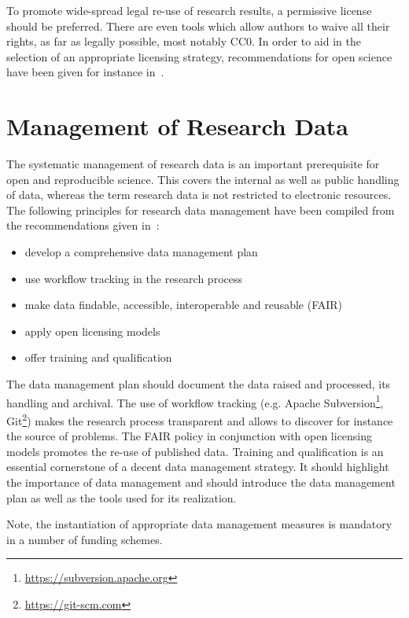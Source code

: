 \documentclass[a4paper, 10pt, twocolumn]{article}
\begin{document}
To promote wide-spread legal re-use of research results, a permissive license should be preferred.
There are even tools which allow authors to waive all their rights,
as far as legally possible, most notably CC0.
In order to aid in the selection of an appropriate licensing strategy, recommendations
for open science have been given for instance in~\cite{Stodden09:CSE}.


\section*{Management of Research Data} \label{sec:data_management}

The systematic management of research data is an important prerequisite for open and 
reproducible science. This covers the internal as well as public handling of data, whereas
the term research data is not restricted to electronic resources. The following principles
for research data management have been compiled from the recommendations given 
in~\cite{DFG_GWP:Book,HRK_FDM:WWW,Stodden2014:JORS,H2020_FAIR:ERC}:
\begin{itemize}
\item develop a comprehensive data management plan
\item use workflow tracking in the research process
\item make data findable, accessible, interoperable and reusable (FAIR)~\cite{H2020_FAIR:ERC}
\item apply open licensing models
\item offer training and qualification
\end{itemize}
The data management plan should document the data raised and processed, its handling and
archival. The use of workflow tracking (e.g. Apache Subversion\footnote{\url{https://subversion.apache.org}}, Git\footnote{\url{https://git-scm.com}}) makes the research process transparent 
and allows to discover for instance the source of problems. The FAIR policy in conjunction with
open licensing models promotes the re-use of published data. Training and qualification is an
essential cornerstone of a decent data management strategy. It should highlight the importance
of data management and should introduce the data management plan as well as the tools used for
its realization.

Note, the instantiation of appropriate data management measures is mandatory in a number 
of funding schemes.
\end{document}
